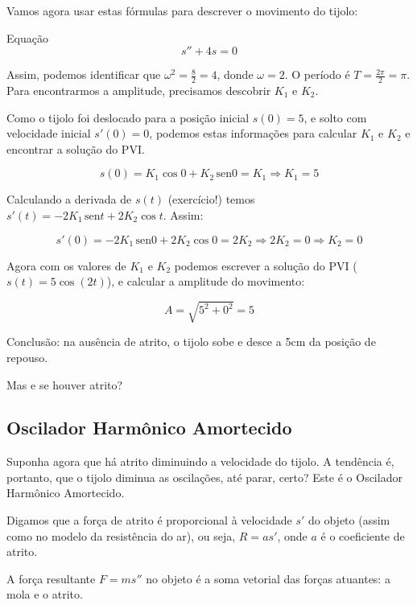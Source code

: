 \documentclass[a4paper]{article}
\providecommand{\sin}{} \renewcommand{\sin}{\hspace{2pt}\mathrm{sen}}
\begin{document}
Vamos agora usar estas fórmulas para descrever o movimento do tijolo:

Equação
\begin{displaymath}
  s''+4s=0
\end{displaymath}

Assim, podemos identificar que $\omega^2=\frac{8}{2}=4$, donde
$\omega=2$. O período é $T=\frac{2\pi}{2}=\pi$. Para encontrarmos a
amplitude, precisamos descobrir $K_1$ e $K_2$.

Como o tijolo foi deslocado para a posição inicial $s(0)=5$, e solto
com velocidade inicial $s'(0)=0$, podemos estas informações para
calcular  $K_1$ e $K_2$ e encontrar a solução do PVI.

\begin{displaymath}
  s(0) = K_1 \cos0 + K_2 \sin 0 = K_1 \Rightarrow K_1 = 5
\end{displaymath}

Calculando a derivada de $s(t)$ (exercício!) temos
$s'(t) = -2K_1 \sin t + 2K_2 \cos t$. Assim:

\begin{displaymath}
  s'(0) = -2K_1 \sin 0 + 2K_2 \cos 0 = 2K_2 \Rightarrow 2K_2 = 0
  \Rightarrow K_2=0
\end{displaymath}

Agora com os valores de $K_1$ e $K_2$ podemos escrever a solução do
PVI ($s(t) = 5\cos(2t)$), e calcular a amplitude do movimento:

\begin{displaymath}
  A = \sqrt{5^2 +0^2} = 5
\end{displaymath}

Conclusão: na ausência de atrito, o tijolo sobe e desce a 5cm da
posição de repouso.

Mas e se houver atrito?

\subsection{Oscilador Harmônico Amortecido}

Suponha agora que há atrito diminuindo a velocidade do tijolo. A
tendência é, portanto, que o tijolo diminua as oscilações, até parar,
certo? Este é o Oscilador Harmônico Amortecido.

Digamos que a força de atrito é proporcional à velocidade $s'$ do
objeto (assim como no modelo da resistência do ar), ou seja, $R=as'$,
onde $a$ é o coeficiente de atrito.%

A força resultante $F=ms''$ no objeto é a soma vetorial das forças
atuantes: a mola e o atrito.
\end{document}
